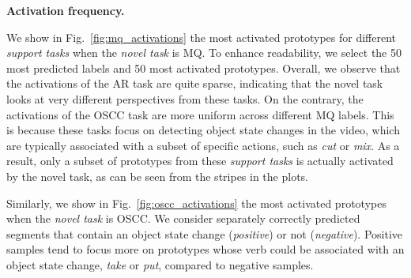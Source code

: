 \smallskip
\smallskip
\noindent\textbf{Activation frequency.}

We show in Fig.~\ref{fig:mq_activations} the most activated prototypes for different \emph{support tasks} when the \emph{novel task} is MQ.
To enhance readability, we select the 50 most predicted labels and 50 most activated prototypes.
Overall, we observe that the activations of the AR task are quite sparse, indicating that the novel task looks at very different perspectives from these tasks.
%
On the contrary, the activations of the OSCC task are more uniform across different MQ labels. This is because these tasks focus on detecting object state changes in the video, which are typically associated with a subset of specific actions, such as \emph{cut} or \emph{mix}.
As a result, only a subset of prototypes from these \emph{support tasks} is actually activated by the novel task, as can be seen from the stripes in the plots.
%


Similarly, we show in Fig.~\ref{fig:oscc_activations} the most activated prototypes when the \emph{novel task} is OSCC.
We consider separately correctly predicted segments that contain an object state change (\emph{positive}) or not (\emph{negative}).
Positive samples tend to focus more on prototypes whose verb could be associated with an object state change, \eg \emph{take} or \emph{put}, compared to negative samples.
